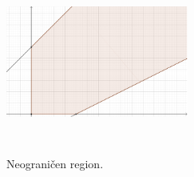 \documentclass[a4paper, utf8, 11pt, colorlinks]{book}
\begin{document}
\begin{figure}[!ht]
    \centering
    \includegraphics[width=170pt,height=170pt]{unbounded-example-solve.eps}
    \caption{Neograničen region.}
    \label{fig:unbounded-example-solve}
\end{figure}
\end{document}
